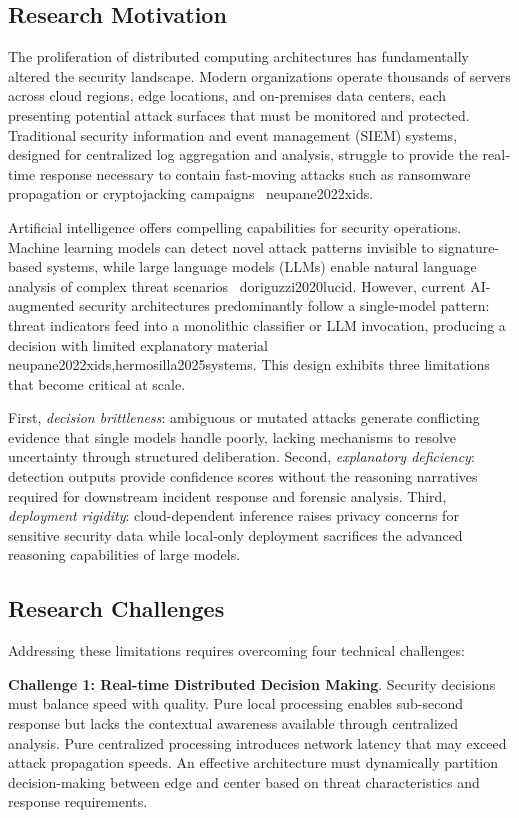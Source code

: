 \subsection{Research Motivation}
\label{subsec:motivation}

The proliferation of distributed computing architectures has fundamentally altered the security landscape. Modern organizations operate thousands of servers across cloud regions, edge locations, and on-premises data centers, each presenting potential attack surfaces that must be monitored and protected. Traditional security information and event management (SIEM) systems, designed for centralized log aggregation and analysis, struggle to provide the real-time response necessary to contain fast-moving attacks such as ransomware propagation or cryptojacking campaigns~
{neupane2022xids}.

Artificial intelligence offers compelling capabilities for security operations. Machine learning models can detect novel attack patterns invisible to signature-based systems, while large language models (LLMs) enable natural language analysis of complex threat scenarios~
{doriguzzi2020lucid}. However, current AI-augmented security architectures predominantly follow a single-model pattern: threat indicators feed into a monolithic classifier or LLM invocation, producing a decision with limited explanatory material~
{neupane2022xids,hermosilla2025systems}. This design exhibits three limitations that become critical at scale.

First, \textit{decision brittleness}: ambiguous or mutated attacks generate conflicting evidence that single models handle poorly, lacking mechanisms to resolve uncertainty through structured deliberation. Second, \textit{explanatory deficiency}: detection outputs provide confidence scores without the reasoning narratives required for downstream incident response and forensic analysis. Third, \textit{deployment rigidity}: cloud-dependent inference raises privacy concerns for sensitive security data while local-only deployment sacrifices the advanced reasoning capabilities of large models.

\subsection{Research Challenges}
\label{subsec:challenges}

Addressing these limitations requires overcoming four technical challenges:

\textbf{Challenge 1: Real-time Distributed Decision Making}. Security decisions must balance speed with quality. Pure local processing enables sub-second response but lacks the contextual awareness available through centralized analysis. Pure centralized processing introduces network latency that may exceed attack propagation speeds. An effective architecture must dynamically partition decision-making between edge and center based on threat characteristics and response requirements.

